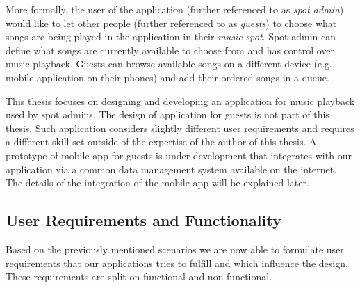 \par
More formally, the user of the application (further referenced to as \textit{spot admin}) would like to let other people (further referenced to as \textit{guests}) to choose what songs are being played in the application in their \textit{music spot}. Spot admin can define what songs are currently available to choose from and has control over music playback. Guests can browse available songs on a different device (e.g., mobile application on their phones) and add their ordered songs in a queue.
\par
This thesis focuses on designing and developing an application for music playback used by spot admins. The design of application for guests is not part of this thesis. Such application considers slightly different user requirements and requires a different skill set outside of the expertise of the author of this thesis. A prototype of mobile app for guests is under development that integrates with our application via a common data management system available on the internet. The details of the integration of the mobile app will be explained later.

\subsection{User Requirements and Functionality}

Based on the previously mentioned scenarios we are now able to formulate user requirements that our applications tries to fulfill and which influence the design. These requirements are split on functional and non-functional.

